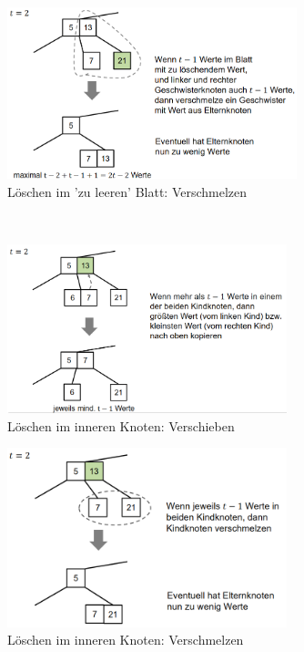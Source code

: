 \documentclass{article}
\begin{document}
            \begin{figure}[ht]
                \centering
                \includegraphics[width=0.75\textwidth]{Bilder/BBdel2.png}
                \caption{Löschen im 'zu leeren' Blatt: Verschmelzen}
                \label{fig:BBdel2}
            \end{figure}\\
            \begin{figure}[ht]
                \centering
                \includegraphics[width=0.725\textwidth]{Bilder/BBdel3.png}
                \caption{Löschen im inneren Knoten: Verschieben}
                \label{fig:BBdel3}
            \end{figure}
            \begin{figure}[ht]
                \centering
                \includegraphics[width=0.725\textwidth]{Bilder/BBdel4.png}
                \caption{Löschen im inneren Knoten: Verschmelzen}
                \label{fig:BBdel4}
            \end{figure}
\end{document}
